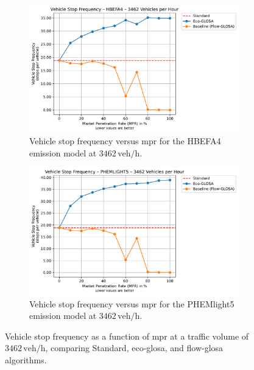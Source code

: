 \begin{figure}[htb]
  \centering
  \begin{subfigure}[b]{0.45\textwidth}
    \includegraphics[width=\textwidth]{data/img/VehicleStopFrequency/VehicleStopFrequency_HBEFA4_Cars3462.pdf}
    \caption{Vehicle stop frequency versus \ac{mpr} for the HBEFA4 emission model at $3462\,\mathrm{veh/h}$.}
    \label{fig:StopFreq_3462_HBEFA4}
  \end{subfigure}\hfill
  \begin{subfigure}[b]{0.45\textwidth}
    \includegraphics[width=\textwidth]{data/img/VehicleStopFrequency/VehicleStopFrequency_PHEMLIGHT5_Cars3462.pdf}
    \caption{Vehicle stop frequency versus \ac{mpr} for the PHEMlight5 emission model at $3462\,\mathrm{veh/h}$.}
    \label{fig:StopFreq_3462_PHEM}
  \end{subfigure}
  \caption{Vehicle stop frequency as a function of \ac{mpr} at a traffic volume of $3462\,\mathrm{veh/h}$, comparing Standard, \ac{eco-glosa}, and \ac{flow-glosa} algorithms.}
  \label{fig:StopFreq_3462}
\end{figure}


